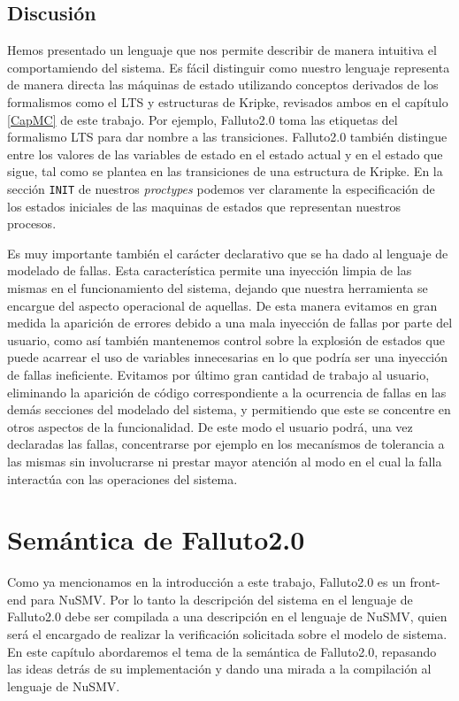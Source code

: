 \documentclass[pdftex,a4paper,12pt]{book}
\begin{document}
\section{Discusi\'on}
Hemos presentado un lenguaje que nos permite describir de manera intuitiva el comportamiendo del sistema. Es f\'acil distinguir como nuestro lenguaje representa de manera directa las m\'aquinas de estado utilizando conceptos derivados de los formalismos como el LTS y estructuras de Kripke, revisados ambos en el cap\'itulo \ref{CapMC} de este trabajo. Por ejemplo, Falluto2.0 toma las etiquetas del formalismo LTS para dar nombre a las transiciones. Falluto2.0 tambi\'en distingue entre los valores de las variables de estado en el estado actual y en el estado que sigue, tal como se plantea en las transiciones de una estructura de Kripke. En la secci\'on \texttt{INIT} de nuestros \textit{proctypes} podemos ver claramente la especificaci\'on de los estados iniciales de las maquinas de estados que representan nuestros procesos.

Es muy importante tambi\'en el car\'acter declarativo que se ha dado al lenguaje de modelado de fallas. Esta caracter\'istica permite una inyecci\'on limpia de las mismas en el funcionamiento del sistema, dejando que nuestra herramienta se encargue del aspecto operacional de aquellas. De esta manera evitamos en gran medida la aparici\'on de errores debido a una mala inyecci\'on de fallas por parte del usuario, como as\'i tambi\'en mantenemos control sobre la explosi\'on de estados que puede acarrear el uso de variables innecesarias en lo que podr\'ia ser una inyecci\'on de fallas ineficiente. Evitamos por \'ultimo gran cantidad de trabajo al usuario, eliminando la aparici\'on de c\'odigo correspondiente a la ocurrencia de fallas en las dem\'as secciones del modelado del sistema, y permitiendo que este se concentre en otros aspectos de la funcionalidad. De este modo el usuario podr\'a, una vez declaradas las fallas, concentrarse por ejemplo en los mecan\'ismos de tolerancia a las mismas sin involucrarse ni prestar mayor atenci\'on al modo en el cual la falla interact\'ua con las operaciones del sistema.



\chapter{Sem\'antica de Falluto2.0}
\label{CapSemanticaDeFalluto}
Como ya mencionamos en la introducci\'on a este trabajo, Falluto2.0 es un front-end para NuSMV. Por lo tanto la descripci\'on del sistema en el lenguaje de Falluto2.0 debe ser compilada a una descripci\'on en el lenguaje de NuSMV, quien ser\'a el encargado de realizar la verificaci\'on solicitada sobre el modelo de sistema.  En este cap\'itulo abordaremos el tema de la sem\'antica de Falluto2.0, repasando las ideas detr\'as de su implementaci\'on y dando una mirada a la compilaci\'on al lenguaje de NuSMV.
\end{document}
